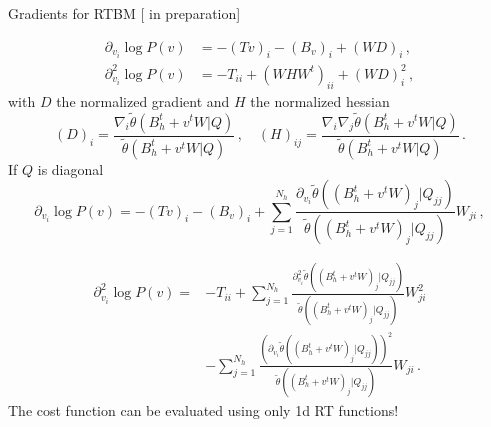 \documentclass[10pt]{beamer}
\begin{document}
\begin{frame}{Gradients for RTBM \hfill \small [\cite{new} in preparation]}

    \begin{equation*}
        \begin{split}
         \partial_{v_i} \log{P(v)} &= - ( T v)_i - (B_v)_i + ( W D)_i\,,\\
         \partial^2_{v_i} \log{P(v)} &= - T _{ii} + (W H W^t)_{ii} + ( W D)^2_i\,,
       \end{split}   
       \end{equation*}
       with $D$ the normalized gradient and $H$ the normalized hessian 
       \begin{equation*}
           (D)_i = \frac{\nabla_i \tilde{\theta}(B^t_h+v^t W \vert Q)}{\tilde{\theta}(B^t_h+v^t W \vert Q)} 
           \,, \quad
           (H)_{ij} = \frac{\nabla_i \nabla_j \tilde{\theta}(B^t_h+v^t W \vert Q)}{\tilde{\theta}(B^t_h+v^t W \vert Q)}\,.
       \end{equation*}
       If $Q$ is diagonal 
       \begin{equation*}
        \partial_{v_i} \log{P(v)} = - ( T v)_i - (B_v)_i + \sum_{j=1}^{N_h} \frac{\partial_{v_i} \tilde{\theta}((B^t_h+v^t W)_j \vert Q_{jj})}{\tilde{\theta}((B^t_h+v^t W)_j \vert Q_{jj})} W_{ji}\,,
   \end{equation*}
   
   \begin{equation*}
   \begin{split}
        \partial_{v_i}^2 \log{P(v)} =& - T_{ii} + 
        \sum_{j=1}^{N_h} \frac{\partial^2_{v_i} \tilde{\theta}((B^t_h+v^t W)_j \vert Q_{jj})}
        {\tilde{\theta}((B^t_h+v^t W)_j \vert Q_{jj})} W_{ji}^2\\
        &
        - 
        \sum_{j=1}^{N_h} \frac{(\partial_{v_i} \tilde{\theta}((B^t_h+v^t W)_j \vert Q_{jj}))^2}
        {\tilde{\theta}((B^t_h+v^t W)_j \vert Q_{jj})} W_{ji}\,.
   \end{split}
   \end{equation*}
   The cost function can be evaluated using only 1d RT functions!
\end{frame}
\end{document}
